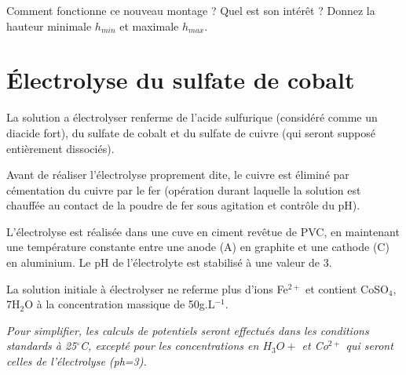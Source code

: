 \documentclass{report}
\begin{document}
Comment fonctionne ce nouveau montage ? Quel est son intérêt ? Donnez la hauteur minimale $h_{min}$ et maximale $h_{max}$.

\newpage

\section*{Électrolyse du sulfate de cobalt}

La solution a électrolyser renferme de l'acide sulfurique (considéré comme un diacide fort), du sulfate de cobalt et du sulfate de cuivre (qui seront supposé entièrement dissociés). 

Avant de réaliser l'électrolyse proprement dite, le cuivre est éliminé par cémentation du cuivre par le fer (opération durant laquelle la solution est chauffée au contact de la poudre de fer sous agitation et contrôle du pH).

L'électrolyse est réalisée dans une cuve en ciment revêtue de PVC, en maintenant une température constante entre une anode (A) en graphite et une cathode (C) en aluminium. Le pH de l'électrolyte est stabilisé à une valeur de 3.

La solution initiale à électrolyser ne referme plus d'ions Fe$^{2+}$  et contient CoSO$_4$, 7H$_2$O à la concentration massique de 50g.L$^{-1}$. 

\textit{Pour simplifier, les calculs de potentiels seront effectués dans les conditions standards à 25$^\circ$C, excepté pour les concentrations en $H_3O+$ et Co$^{2+}$ qui seront celles de l'électrolyse (ph=3).}
\end{document}
